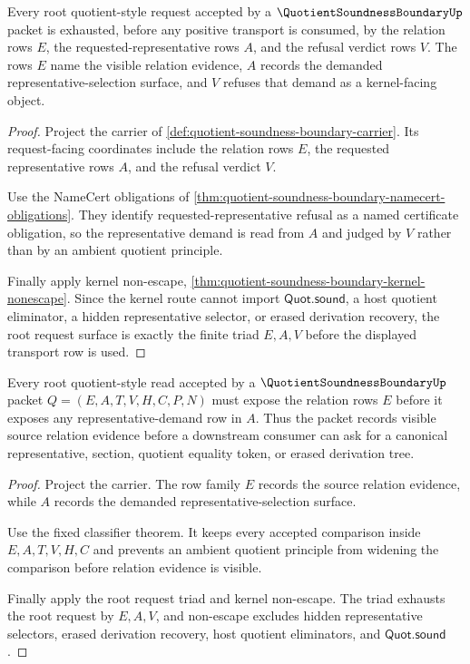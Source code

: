 \begin{theorem}
\label{thm:quotient-soundness-boundary-root-request-triad}
Every root quotient-style request accepted by a $\QuotientSoundnessBoundaryUp$ packet is exhausted, before any positive transport is consumed, by the relation rows $E$, the requested-representative rows $A$, and the refusal verdict rows $V$. The rows $E$ name the visible relation evidence, $A$ records the demanded representative-selection surface, and $V$ refuses that demand as a kernel-facing object.
\end{theorem}
\begin{proof}
Project the carrier of \autoref{def:quotient-soundness-boundary-carrier}. Its request-facing coordinates include the relation rows $E$, the requested representative rows $A$, and the refusal verdict $V$.

Use the NameCert obligations of \autoref{thm:quotient-soundness-boundary-namecert-obligations}. They identify requested-representative refusal as a named certificate obligation, so the representative demand is read from $A$ and judged by $V$ rather than by an ambient quotient principle.

Finally apply kernel non-escape, \autoref{thm:quotient-soundness-boundary-kernel-nonescape}. Since the kernel route cannot import $\mathsf{Quot.sound}$, a host quotient eliminator, a hidden representative selector, or erased derivation recovery, the root request surface is exactly the finite triad $E,A,V$ before the displayed transport row is used.
\end{proof}

\begin{theorem}
\label{thm:quotient-soundness-boundary-root-relation-row-exposure}
Every root quotient-style read accepted by a $\QuotientSoundnessBoundaryUp$ packet $Q=(E,A,T,V,H,C,P,N)$ must expose the relation rows $E$ before it exposes any representative-demand row in $A$. Thus the packet records visible source relation evidence before a downstream consumer can ask for a canonical representative, section, quotient equality token, or erased derivation tree.
\end{theorem}
\begin{proof}
Project the carrier. The row family $E$ records the source relation evidence, while $A$ records the demanded representative-selection surface.

Use the fixed classifier theorem. It keeps every accepted comparison inside $E,A,T,V,H,C$ and prevents an ambient quotient principle from widening the comparison before relation evidence is visible.

Finally apply the root request triad and kernel non-escape. The triad exhausts the root request by $E,A,V$, and non-escape excludes hidden representative selectors, erased derivation recovery, host quotient eliminators, and $\mathsf{Quot.sound}$.
\end{proof}

